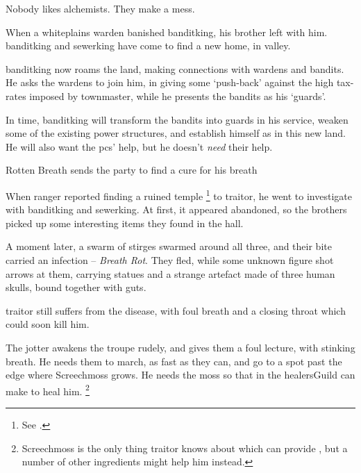 \label{entitlement}

\begin{exampletext}
  \noindent
  Nobody likes alchemists.
  They make a mess.

  When a \gls{whiteplains} \gls{warden} banished \gls{banditking}, his brother left with him.
  \Gls{banditking} and \gls{sewerking} have come to find a new home, in \gls{valley}.

  \Gls{banditking} now roams the land, making connections with \glspl{warden} and bandits.
  He asks the \glspl{warden} to join him, in giving some `push-back' against the high tax-rates imposed by \gls{townmaster}, while he presents the bandits as his `guards'.
\end{exampletext}

In time, \gls{banditking} will transform the bandits into \glspl{guard} in his service, weaken some of the existing power structures, and establish himself as  in this new land.
He will also want the \glspl{pc}' help, but he doesn't \emph{need} their help.

{Rotten Breath}%
{ sends the party to find a cure for his breath}%
\label{rottenBreath}

\begin{exampletext}
  When  \gls{ranger} reported finding a ruined temple%
  \footnote{See .}
  to \gls{traitor}, he went to investigate with \gls{banditking} and \gls{sewerking}.
  At first, it appeared abandoned, so the brothers picked up some interesting items they found in the hall.

  A moment later, a swarm of stirges swarmed around all three, and their bite carried an infection -- \textit{Breath Rot}.
  They fled, while some unknown figure shot arrows at them, carrying statues and a strange \gls{artefact} made of three human skulls, bound together with guts.

  \Gls{traitor} still suffers from the disease, with foul breath and a closing throat which could soon kill him.
\end{exampletext}

\noindent
The \gls{jotter} awakens the troupe rudely, and gives them a foul lecture, with stinking breath.
He needs them to march, as fast as they can, and go to a spot past the \gls{edge} where Screechmoss%
grows.
He needs the moss so that  in the \gls{healersGuild} can make  to heal him.%
\footnote{Screechmoss is the only thing \gls{traitor} knows about which can provide , but a number of other \glspl{ingredient} might help him instead.}

